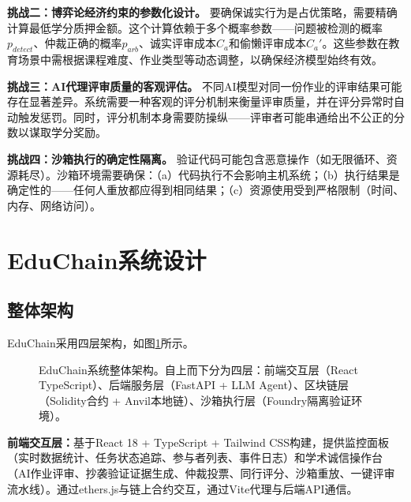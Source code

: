 \documentclass[10.5pt,compsoc]{CjC}
\begin{document}
\textbf{挑战二：博弈论经济约束的参数化设计。} 要确保诚实行为是占优策略，需要精确计算最低学分质押金额。这个计算依赖于多个概率参数——问题被检测的概率$p_{detect}$、仲裁正确的概率$p_{arb}$、诚实评审成本$C_a$和偷懒评审成本$C_a'$。这些参数在教育场景中需根据课程难度、作业类型等动态调整，以确保经济模型始终有效。

\textbf{挑战三：AI代理评审质量的客观评估。} 不同AI模型对同一份作业的评审结果可能存在显著差异。系统需要一种客观的评分机制来衡量评审质量，并在评分异常时自动触发惩罚。同时，评分机制本身需要防操纵——评审者可能串通给出不公正的分数以谋取学分奖励。

\textbf{挑战四：沙箱执行的确定性隔离。} 验证代码可能包含恶意操作（如无限循环、资源耗尽）。沙箱环境需要确保：（a）代码执行不会影响主机系统；（b）执行结果是确定性的——任何人重放都应得到相同结果；（c）资源使用受到严格限制（时间、内存、网络访问）。

\section{EduChain系统设计}

\subsection{整体架构}

EduChain采用四层架构，如图\ref{fig:arch}所示。

\begin{figure}[H]
\centering
{}
\caption{EduChain系统整体架构。自上而下分为四层：前端交互层（React TypeScript）、后端服务层（FastAPI + LLM Agent）、区块链层（Solidity合约 + Anvil本地链）、沙箱执行层（Foundry隔离验证环境）。}
\label{fig:arch}
\end{figure}

\textbf{前端交互层：}基于React 18 + TypeScript + Tailwind CSS构建，提供监控面板（实时数据统计、任务状态追踪、参与者列表、事件日志）和学术诚信操作台（AI作业评审、抄袭验证证据生成、仲裁投票、同行评分、沙箱重放、一键评审流水线）。通过ethers.js与链上合约交互，通过Vite代理与后端API通信。
\end{document}
